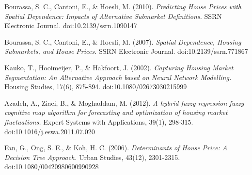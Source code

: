 \documentclass[10pt]{article}
\begin{document}
\begin{multicols}{2}
\begin{thebibliography}{13}
			Bourassa, S. C., Cantoni, E., \& Hoesli, M. (2010). 
			\textit{Predicting House Prices with Spatial Dependence: Impacts of Alternative Submarket Definitions.}
			SSRN Electronic Journal. doi:10.2139/ssrn.1090147
			
			Bourassa, S. C., Cantoni, E., \& Hoesli, M. (2007).
			\textit{Spatial Dependence, Housing Submarkets, and House Prices.}
			SSRN Electronic Journal. doi:10.2139/ssrn.771867
			
			Kauko, T., Hooimeijer, P., \& Hakfoort, J. (2002).
			\textit{Capturing Housing Market Segmentation: An Alternative Approach based on Neural Network Modelling.}
			Housing Studies, 17(6), 875-894. doi:10.1080/02673030215999
			
			Azadeh, A., Ziaei, B., \& Moghaddam, M. (2012).
			\textit{A hybrid fuzzy regression-fuzzy cognitive map algorithm for forecasting and optimization of housing market fluctuations.}
			Expert Systems with Applications, 39(1), 298-315. doi:10.1016/j.eswa.2011.07.020
			
			Fan, G., Ong, S. E., \& Koh, H. C. (2006).
			\textit{Determinants of House Price: A Decision Tree Approach.}
			Urban Studies, 43(12), 2301-2315. doi:10.1080/00420980600990928
		\end{thebibliography}
	\end{multicols}
\end{document}
